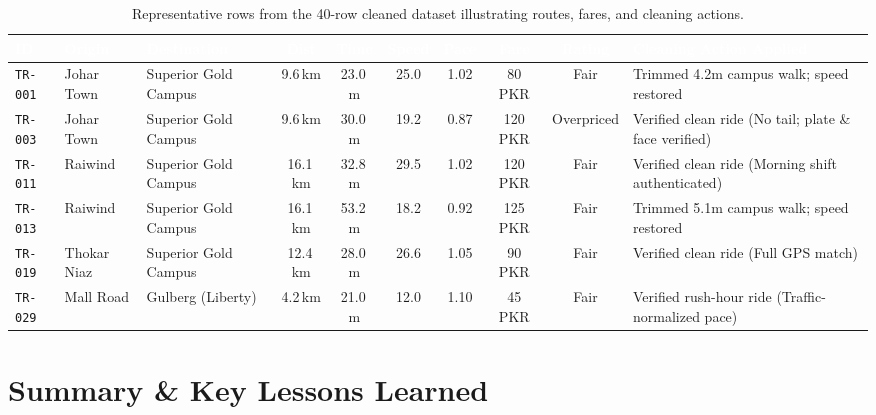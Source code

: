\documentclass[10pt, a4paper]{article}
\begin{document}
\begin{table}[h!]
\centering
\fontsize{7.2pt}{9.0pt}\selectfont
\begin{tabularx}{\textwidth}{|l|l|l|c|c|c|c|c|c|l|}
\hline
\rowcolor{navyblue}\textcolor{white}{\textbf{ID}} & \textcolor{white}{\textbf{Origin}} & \textcolor{white}{\textbf{Destination}} & \textcolor{white}{\textbf{Dist}} & \textcolor{white}{\textbf{Time}} & \textcolor{white}{\textbf{Speed}} & \textcolor{white}{\textbf{Pace}} & \textcolor{white}{\textbf{Fare}} & \textcolor{white}{\textbf{Rating}} & \textcolor{white}{\textbf{Cleaning Action Applied}} \\ \hline
\rowcolor{white}\texttt{TR-001} & Johar Town & Superior Gold Campus & 9.6\,km & 23.0\,m & 25.0 & 1.02 & 80 PKR & Fair & Trimmed 4.2m campus walk; speed restored \\ \hline
\rowcolor{lightgray}\texttt{TR-003} & Johar Town & Superior Gold Campus & 9.6\,km & 30.0\,m & 19.2 & 0.87 & 120 PKR & Overpriced & Verified clean ride (No tail; plate \& face verified) \\ \hline
\rowcolor{white}\texttt{TR-011} & Raiwind & Superior Gold Campus & 16.1\,km & 32.8\,m & 29.5 & 1.02 & 120 PKR & Fair & Verified clean ride (Morning shift authenticated) \\ \hline
\rowcolor{lightgray}\texttt{TR-013} & Raiwind & Superior Gold Campus & 16.1\,km & 53.2\,m & 18.2 & 0.92 & 125 PKR & Fair & Trimmed 5.1m campus walk; speed restored \\ \hline
\rowcolor{white}\texttt{TR-019} & Thokar Niaz & Superior Gold Campus & 12.4\,km & 28.0\,m & 26.6 & 1.05 & 90 PKR & Fair & Verified clean ride (Full GPS match) \\ \hline
\rowcolor{lightgray}\texttt{TR-029} & Mall Road & Gulberg (Liberty) & 4.2\,km & 21.0\,m & 12.0 & 1.10 & 45 PKR & Fair & Verified rush-hour ride (Traffic-normalized pace) \\ \hline
\end{tabularx}
\caption{\small Representative rows from the 40-row cleaned dataset illustrating routes, fares, and cleaning actions.}
\end{table}

\section{Summary \& Key Lessons Learned}
\end{document}

